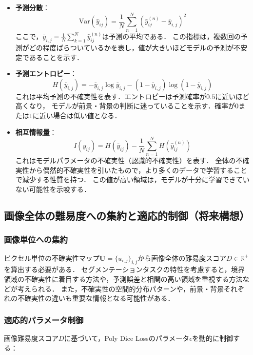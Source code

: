\documentclass[10pt, a4paper, twocolumn]{jarticle}
\begin{document}
\begin{itemize}
  \item \textbf{予測分散}：
  \begin{equation}
    \text{Var}(\hat{y}_{ij}) = \frac{1}{N} \sum_{n=1}^{N} (\hat{y}_{ij}^{(n)} - \bar{y}_{i,j})^2
  \end{equation}
  ここで，$\bar{y}_{i,j} = \frac{1}{N} \sum_{k = 1}^{N} \hat{y}_{ij} ^ {(n)}$は予測の平均である．
  この指標は，複数回の予測がどの程度ばらついているかを表し，値が大きいほどモデルの予測が不安定であることを示す．
  \item \textbf{予測エントロピー}：
  \begin{equation}
    H(\bar{y}_{i,j}) = - \bar{y}_{i,j} \log{\bar{y}_{i,j}} - (1 - \bar{y}_{i,j}) \log{(1 - \bar{y}_{i,j})}
  \end{equation}
  これは平均予測の不確実性を表す．エントロピーは予測確率が$0.5$に近いほど高くなり，
  モデルが前景・背景の判断に迷っていることを示す．確率が$0$または$1$に近い場合は低い値となる．
  \item \textbf{相互情報量}：
  \begin{equation}
    I(y_{ij}) = H(\bar{y}_{ij}) - \frac{1}{N}\sum_{n=1}^{N} H(\hat{y}_{ij}^{(n)})
  \end{equation}
  これはモデルパラメータの不確実性（認識的不確実性）を表す．
  全体の不確実性から偶然的不確実性を引いたもので，より多くのデータで学習することで減少する性質を持つ．
  この値が高い領域は，モデルが十分に学習できていない可能性を示唆する．
\end{itemize}

\subsection{画像全体の難易度への集約と適応的制御（将来構想）}

\subsubsection{画像単位への集約}
ピクセル単位の不確実性マップ$\mathbf{U} = \{u_{i,j}\}_{i,j}$から画像全体の難易度スコア$D \in \mathbb{R}^+$を算出する必要がある．
セグメンテーションタスクの特性を考慮すると，境界領域の不確実性に着目する方法や，予測誤差と相関の高い領域を重視する方法などが考えられる．
また，不確実性の空間的分布パターンや，前景・背景それぞれの不確実性の違いも重要な情報となる可能性がある．

\subsubsection{適応的パラメータ制御}
画像難易度スコア$D$に基づいて，Poly Dice Lossのパラメータ$\epsilon$を動的に制御する：
\end{document}
